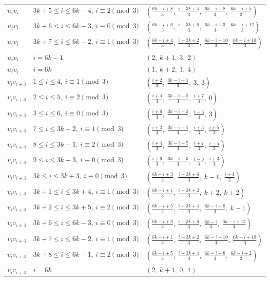 \begin{longtable}{lll}
$u_i v_i$ & $3k+5 \le i \le 6k-4,\ i \equiv 2 \pmod{3}$ & $(\frac{6k-i+8}{3},\ \frac{i-3k+4}{3},\ \frac{6k-i+8}{3},\ \frac{6k-i+5}{3})$ \\
$u_i v_i$ & $3k+6 \le i \le 6k-3,\ i \equiv 0 \pmod{3}$ & $(\frac{6k-i+6}{3},\ \frac{i-3k+6}{3},\ \frac{6k-i+3}{3},\ \frac{6k-i+12}{3})$ \\
$u_i v_i$ & $3k+7 \le i \le 6k-2,\ i \equiv 1 \pmod{3}$ & $(\frac{6k-i+4}{3},\ \frac{i-3k+2}{3},\ \frac{6k-i+10}{3},\ \frac{6k-i+10}{3})$ \\
$u_i v_i$ & $i = 6k-1$ & $(2,\ k+1,\ 3,\ 2)$ \\
$u_i v_i$ & $i = 6k$ & $(1,\ k+2,\ 1,\ 4)$ \\
$v_i v_{i+3}$ & $1 \le i \le 4,\ i \equiv 1 \pmod{3}$ & $(\frac{i+2}{3},\ \frac{3k-i+1}{3},\ 3,\ 3)$ \\
$v_i v_{i+3}$ & $2 \le i \le 5,\ i \equiv 2 \pmod{3}$ & $(\frac{i+4}{3},\ \frac{3k-i+5}{3},\ \frac{i+7}{3},\ 0)$ \\
$v_i v_{i+3}$ & $3 \le i \le 6,\ i \equiv 0 \pmod{3}$ & $(\frac{i+6}{3},\ \frac{3k-i+3}{3},\ \frac{i-3}{3},\ 3)$ \\
$v_i v_{i+3}$ & $7 \le i \le 3k-2,\ i \equiv 1 \pmod{3}$ & $(\frac{i+2}{3},\ \frac{3k-i+1}{3},\ \frac{i+5}{3},\ \frac{i+5}{3})$ \\
$v_i v_{i+3}$ & $8 \le i \le 3k-1,\ i \equiv 2 \pmod{3}$ & $(\frac{i+4}{3},\ \frac{3k-i+5}{3},\ \frac{i+7}{3},\ \frac{i-5}{3})$ \\
$v_i v_{i+3}$ & $9 \le i \le 3k-3,\ i \equiv 0 \pmod{3}$ & $(\frac{i+6}{3},\ \frac{3k-i+3}{3},\ \frac{i-3}{3},\ \frac{i+3}{3})$ \\
$v_i v_{i+3}$ & $3k \le i \le 3k+3,\ i \equiv 0 \pmod{3}$ & $(\frac{6k-i+3}{3},\ \frac{i-3k+6}{3},\ k-1,\ \frac{i+3}{3})$ \\
$v_i v_{i+3}$ & $3k+1 \le i \le 3k+4,\ i \equiv 1 \pmod{3}$ & $(\frac{6k-i+1}{3},\ \frac{i-3k+2}{3},\ k+2,\ k+2)$ \\
$v_i v_{i+3}$ & $3k+2 \le i \le 3k+5,\ i \equiv 2 \pmod{3}$ & $(\frac{6k-i+5}{3},\ \frac{i-3k+4}{3},\ \frac{6k-i+8}{3},\ k-1)$ \\
$v_i v_{i+3}$ & $3k+6 \le i \le 6k-3,\ i \equiv 0 \pmod{3}$ & $(\frac{6k-i+3}{3},\ \frac{i-3k+6}{3},\ \frac{6k-i}{3},\ \frac{6k-i+12}{3})$ \\
$v_i v_{i+3}$ & $3k+7 \le i \le 6k-2,\ i \equiv 1 \pmod{3}$ & $(\frac{6k-i+1}{3},\ \frac{i-3k+2}{3},\ \frac{6k-i+10}{3},\ \frac{6k-i+10}{3})$ \\
$v_i v_{i+3}$ & $3k+8 \le i \le 6k-1,\ i \equiv 2 \pmod{3}$ & $(\frac{6k-i+5}{3},\ \frac{i-3k+4}{3},\ \frac{6k-i+8}{3},\ \frac{6k-i+2}{3})$ \\
$v_i v_{i+3}$ & $i = 6k$ & $(2,\ k+1,\ 0,\ 4)$ \\
\hline
\end{longtable}
